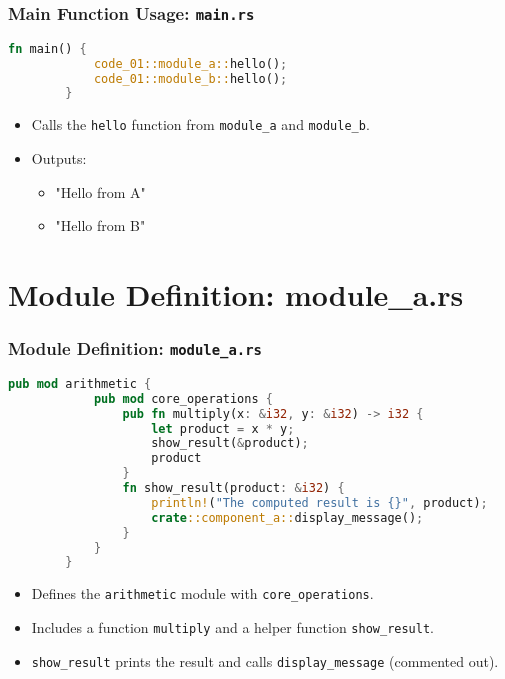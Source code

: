 \documentclass[aspectratio=169, table]{beamer}
\begin{document}
\begin{frame}[fragile]
	\frametitle{Main Function Usage: \texttt{main.rs}}
	\begin{lstlisting}[language=Rust]
		fn main() { 
			code_01::module_a::hello();
			code_01::module_b::hello(); 
		}
	\end{lstlisting}
	\begin{itemize}
		\item Calls the \texttt{hello} function from \texttt{module\_a} and \texttt{module\_b}.
		\item Outputs:
		\begin{itemize}
			\item "Hello from A"
			\item "Hello from B"
		\end{itemize}
	\end{itemize}
\end{frame}

\section{Module Definition: module\_a.rs}
\begin{frame}[fragile]
	\frametitle{Module Definition: \texttt{module\_a.rs}}
	\begin{lstlisting}[language=Rust]
		pub mod arithmetic {
			pub mod core_operations {
				pub fn multiply(x: &i32, y: &i32) -> i32 {
					let product = x * y;
					show_result(&product);
					product
				}
				fn show_result(product: &i32) {
					println!("The computed result is {}", product);
					crate::component_a::display_message();
				}
			}
		}
	\end{lstlisting}
	\begin{itemize}
		\item Defines the \texttt{arithmetic} module with \texttt{core\_operations}.
		\item Includes a function \texttt{multiply} and a helper function \texttt{show\_result}.
		\item \texttt{show\_result} prints the result and calls \texttt{display\_message} (commented out).
	\end{itemize}
\end{frame}
\end{document}
